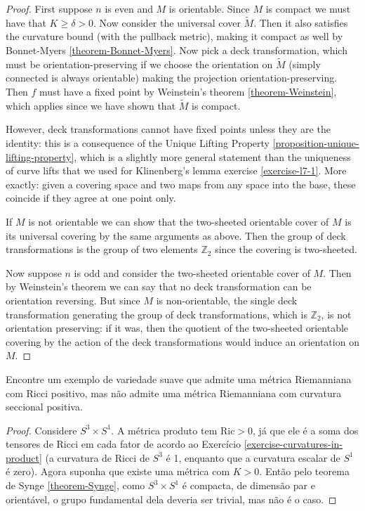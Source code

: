 \begin{proof}
First suppose $n$ is even and $M$ is orientable. Since $M$ is compact we must
have that $K\geq \delta>0$. Now consider the universal cover $\tilde{M}$. Then
it also satisfies the curvature bound (with the pullback metric), 
making it compact as well by Bonnet-Myers \ref{theorem-Bonnet-Myers}. 
Now pick a deck transformation, which must be
orientation-preserving if we choose the orientation on $\tilde{M}$ (simply
connected is always orientable) making the projection orientation-preserving.
Then $f$ must have a fixed point by Weinstein's theorem \ref{theorem-Weinstein},
which applies since we have shown that $\tilde{M}$ is compact. 

However, deck transformations cannot have fixed points unless they are the 
identity: this is a consequence of the Unique Lifting Property
 \ref{proposition-unique-lifting-property}, which is a 
slightly more general statement than the uniqueness of curve lifts that we 
used for Klinenberg's lemma exercise \ref{exercise-l7-1}. 
More exactly: given a covering space and two maps from any space into the base, 
these coincide if they agree at one point only.

If $M$ is not orientable we can show that the two-sheeted orientable cover of
$M$ is its universal covering by the same arguments as above. Then the group of
deck transformations is the group of two elements $\mathbb{Z}_2$ since the
covering is two-sheeted.

Now suppose $n$ is odd and consider the two-sheeted orientable cover of $M$.
Then by Weinstein's theorem we can say that no deck transformation can be
orientation reversing. But since $M$ is non-orientable, the single deck
transformation generating the group of deck transformations, which is
$\mathbb{Z}_2$, is not orientation preserving: if it was, then the quotient of
the two-sheeted orientable covering by the action of the deck transformations
would induce an orientation on $M$.
\end{proof}

\begin{exercise}
\label{exercise-positive-Ricci-but-no-positive-sectional}
Encontre um exemplo de variedade suave que admite uma métrica Riemanniana com
Ricci positivo, mas não admite uma métrica Riemanniana com curvatura seccional
positiva.
\end{exercise}

\begin{proof}
Considere $S^3\times S^1$. A métrica produto tem $\text{Ric}>0$, já que ele é a
soma dos tensores de Ricci em cada fator de acordo ao Exercício 
\ref{exercise-curvatures-in-product} (a curvatura de Ricci de $S^3$ é 1, 
enquanto que a curvatura escalar de $S^1$ é zero). Agora suponha que existe uma
 métrica com $K>0$. Então pelo teorema de Synge \ref{theorem-Synge}, como
$S^3\times S^1$ é compacta, de dimensão par e orientável, o grupo fundamental
dela deveria ser trivial, mas não é o caso.
\end{proof}

